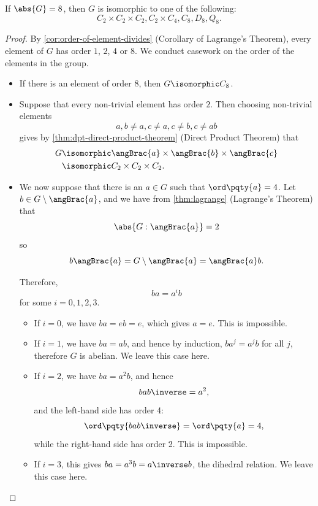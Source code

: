 \begin{lemma}
    \label{lem:groups-of-order-8}%
    If \(\abs{G} = 8\), then \(G\) is isomorphic to one of the following:
    \[
        C_2 \times C_2 \times C_2, C_2 \times C_4, C_8, D_8, Q_8.
    \]
\end{lemma}

\begin{proof}
    By \autoref{cor:order-of-element-divides} (Corollary of Lagrange's Theorem), every element of \(G\) has order \(1\), \(2\), \(4\) or \(8\). We conduct casework on the order of the elements in the group.

    \begin{itemize}
        \item If there is an element of order \(8\), then \(G \isomorphic C_8\).
        
        \item Suppose that every non-trivial element has order \(2\). Then choosing non-trivial elements
        \[
            a, b \neq a, c \neq a, c \neq b, c \neq ab
        \]
        gives by \autoref{thm:dpt-direct-product-theorem} (Direct Product Theorem) that
        \begin{align*}
            G &\isomorphic \angBrac{a} \times \angBrac{b} \times \angBrac{c} \\
            &\isomorphic C_2 \times C_2 \times C_2.
        \end{align*}

        \item We now suppose that there is an \(a \in G\) such that \(\ord\pqty{a} = 4\). Let \(b \in G \setminus \angBrac{a}\), and we have from \autoref{thm:lagrange} (Lagrange's Theorem) that
        \[
            \abs{G : \angBrac{a}} = 2
        \]
        so
        \[
            b\angBrac{a} = G \setminus \angBrac{a} = \angBrac{a} b.
        \]

        Therefore,
        \[
            b a = a^i b
        \]
        for some \(i = 0, 1, 2, 3\).

        \begin{itemize}
            \item If \(i = 0\), we have \(ba = eb = e\), which gives \(a = e\). This is impossible.
            \item If \(i = 1\), we have \(ba = ab\), and hence by induction, \(b a^j = a^j b\) for all \(j\), therefore \(G\) is abelian. We leave this case here.
            \item If \(i = 2\), we have \(ba = a^2 b\), and hence
            \[
                b a b\inverse = a^2,
            \]
            and the left-hand side has order 4:
            \[
                \ord\pqty{b a b \inverse} = \ord\pqty{a} = 4,
            \]
            while the right-hand side has order 2. This is impossible.
            \item If \(i = 3\), this gives \(ba = a^3 b = a\inverse b\), the dihedral relation. We leave this case here.
        \end{itemize}


\end{itemize}
\end{proof}
